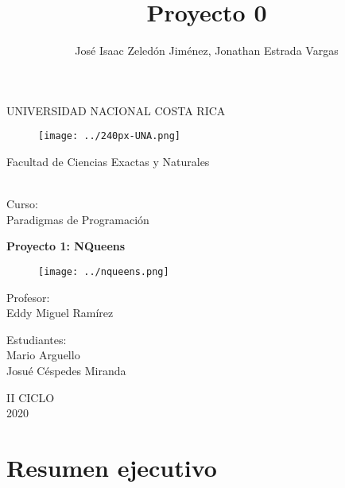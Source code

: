 \documentclass[10pt,a4paper]{article}
\author{José Isaac Zeledón Jiménez, Jonathan Estrada Vargas}
\title{Proyecto 0}
\begin{document}
\begin{titlepage}
\begin{center}
\begin{large}
UNIVERSIDAD NACIONAL COSTA RICA \\
\begin{figure}[htp]
\centering
\texttt{[image: ../240px-UNA.png]} 
\label{foto}
\end{figure}
\end{large}
\vspace*{1cm}
\begin{large}
Facultad de Ciencias Exactas y Naturales
\end{large} 
\begin{large}
\vspace*{1cm}\\
Curso:\\
\vspace*{2mm}
Paradigmas de Programación\\
\end{large}
\vspace*{12mm}
\begin{large}
\textbf{Proyecto 1: 
NQueens
}\\
\end{large}
\begin{figure}[htp]
\centering
\texttt{[image: ../nqueens.png]} 
\label{foto}
\end{figure}
\begin{large}
\vspace*{1cm}
Profesor:\\
\vspace*{5mm}
Eddy Miguel Ramírez\\
\end{large}
\begin{large}
\vspace*{1cm}
Estudiantes: \\
\vspace*{5mm}
Mario Arguello \\
Josué Céspedes Miranda \\
\end{large}
\vspace*{1cm}
II CICLO\\
\vspace*{1cm}
2020
\end{center}
\end{titlepage}
\tableofcontents
\pagebreak
\section{Resumen ejecutivo}
\end{document}
